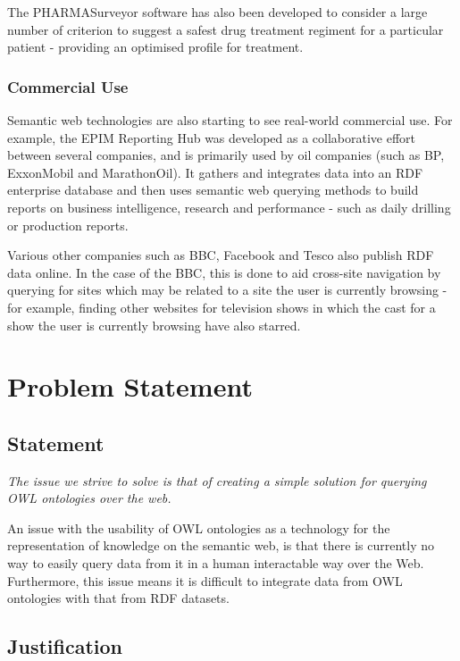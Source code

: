 \documentclass{article}
\begin{document}
The PHARMASurveyor software has also been developed to consider a large number
of criterion to suggest a safest drug treatment regiment for a particular
patient - providing an optimised profile for treatment. 

\subsubsection{Commercial Use}

Semantic web technologies are also starting to see real-world commercial use.
For example, the EPIM Reporting Hub was developed as a collaborative effort
between several companies, and is primarily used by oil companies (such as BP,
ExxonMobil and MarathonOil). It gathers and integrates data into an RDF enterprise 
database and then uses semantic web querying methods to build reports on business 
intelligence, research and performance - such as daily drilling or production
reports.

Various other companies such as BBC, Facebook and Tesco also publish RDF data
online. In the case of the BBC, this is done to aid cross-site navigation by
querying for sites which may be related to a site the user is currently browsing
- for example, finding other websites for television shows in which the cast for
a show the user is currently browsing have also starred.

\section{Problem Statement}

\subsection{Statement}

\emph{The issue we strive to solve is that of creating a simple solution for querying
OWL ontologies over the web.}

An issue with the usability of OWL ontologies as a technology for the
representation of knowledge on the semantic web, is that there is currently no
way to easily query data from it in a human interactable way over the Web.
Furthermore, this issue means it is difficult to integrate data from OWL
ontologies with that from RDF datasets. 

\subsection{Justification}
\end{document}
